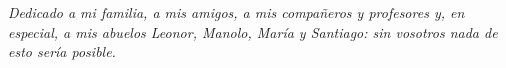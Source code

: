\begin{flushright}
\textit{Dedicado a mi familia, a mis amigos, a mis compañeros y profesores y, en especial, a mis abuelos Leonor, Manolo, María y Santiago: sin vosotros nada de esto sería posible.}
\end{flushright}
\newpage
\thispagestyle{empty}
\hspace*{0.5cm}
\newpage